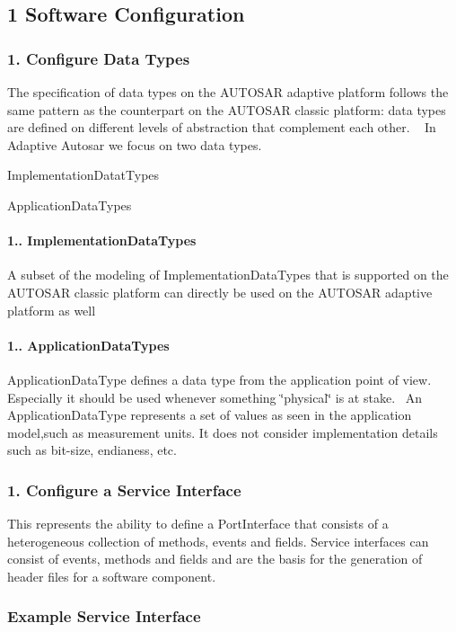 \subsection*{1 Software Configuration}

\subsubsection*{1. Configure Data Types}

The specification of data types on the A\+U\+T\+O\+S\+AR adaptive platform follows the same pattern as the counterpart on the A\+U\+T\+O\+S\+AR classic platform\+: data types are defined on different levels of abstraction that complement each other. ~\newline
 In Adaptive Autosar we focus on two data types.
\begin{DoxyItemize}
\item Implementation\+Datat\+Types
\item Application\+Data\+Types
\end{DoxyItemize}

\paragraph*{1.. Implementation\+Data\+Types}

A subset of the modeling of Implementation\+Data\+Types that is supported on the A\+U\+T\+O\+S\+AR classic platform can directly be used on the A\+U\+T\+O\+S\+AR adaptive platform as well

 \paragraph*{1.. Application\+Data\+Types}

Application\+Data\+Type defines a data type from the application point of view. Especially it should be used whenever something \char`\"{}physical\char`\"{} is at stake.~\newline
 An Application\+Data\+Type represents a set of values as seen in the application model,such as measurement units. It does not consider implementation details such as bit-\/size, endianess, etc.

 \subsubsection*{1. Configure a Service Interface}

This represents the ability to define a Port\+Interface that consists of a heterogeneous collection of methods, events and fields. Service interfaces can consist of events, methods and fields and are the basis for the generation of header files for a software component.  \subsubsection*{Example Service Interface}

